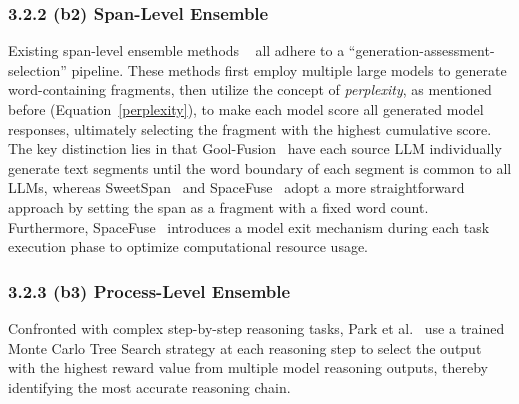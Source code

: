 \documentclass{article}
\begin{document}
\subsubsection{3.2.2 (b2) Span-Level Ensemble}
\label{Span-level Ensemble}


Existing span-level ensemble methods ~\cite{liu2024cool,xu2025hit,lv2024specfuse}  all adhere to a ``generation-assessment-selection'' pipeline. 
These methods first employ multiple large models to generate word-containing fragments, then utilize the concept of \textit{perplexity}, as mentioned before (Equation~\ref{perplexity}), to make each model score all generated model responses, ultimately selecting the fragment with the highest cumulative score.
The key distinction lies in that Gool-Fusion~\cite{liu2024cool}
have each source LLM individually generate text segments until
the word boundary of each segment is common to all LLMs, whereas SweetSpan~\cite{xu2025hit} and SpaceFuse~\cite{lv2024specfuse} adopt a more straightforward approach by setting the span as a fragment with a fixed word count. 
Furthermore, SpaceFuse~\cite{lv2024specfuse} introduces a model exit mechanism during each task execution phase to optimize computational resource usage.


\subsubsection{3.2.3 (b3) Process-Level Ensemble}
\label{Process-level Ensemble}

Confronted with complex step-by-step reasoning tasks, Park et al.~ use a trained Monte Carlo Tree Search strategy at each reasoning step to select the output with the highest reward value from multiple model reasoning outputs, thereby identifying the most accurate reasoning chain.











\setlength{\cmidrulewidth}{0.01em}  
\end{document}
